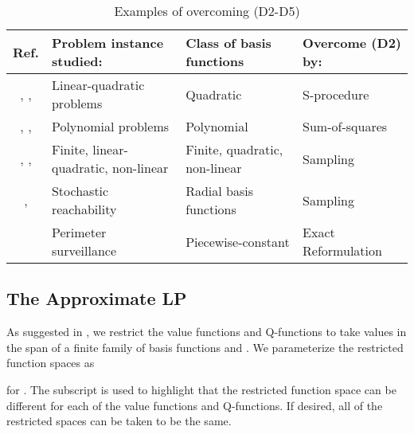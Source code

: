 \documentclass[journal]{IEEEtran}
\newcommand{\textQ}{Q}
\begin{document}
\begin{table*} [t] \centering
\caption{Examples of overcoming (D2-D5)}
\vspace{-0.1cm}
\begin{tabular}{|c|l|l|l|}
		\hline
		Ref.		& Problem instance studied:   & Class of basis functions  & Overcome (D2) by:
		\\
		\hline \cite{boyd_iteratedBellman}, \cite{boyd_2011_minmax}, \cite{boyd_2013_iteratedApproxValueFunctions}
		&
		Linear-quadratic problems
		&
		Quadratic
		&
		S-procedure
		\\
		\hline
		\cite{lasserre_2009_soc_via_occupation_measures}, \cite{boyd_iteratedBellman}, \cite{summers_ADPwithSOS}
		&
		Polynomial problems
		&
		Polynomial
		&
		Sum-of-squares
		\\ 
		\hline
		\cite{vanroy_sampDP}, \cite{boyd_2012_quadraticADP}, \cite{sutter_2014_ADPsamp}
		&
		Finite, linear-quadratic, non-linear
		&
		Finite, quadratic, non-linear
		&
		Sampling
		\\
		\hline
		\cite{nikos_2013_ADPforReachability}, \cite{nikos_2015_ADPforReachability_arXiv}
		&
		Stochastic reachability
		&
		Radial basis functions
		&
		Sampling
		\\
		\hline
		\cite{swaroop_2010_pwcValueFunc}
		\cite{swaroop_2011_pwcValueFunc_forPerimeterPatrol}
		&
		Perimeter surveillance
		&
		Piecewise-constant
		&
		Exact Reformulation
		\\
		\hline
		
	\end{tabular}
\vspace{-0.2cm}
\label{tab:D2_D5_reformuation_summary}
\end{table*}









\subsection{The Approximate LP} \label{sec:adp_approxlp}

As suggested in \cite{schweitzer_originalMDP}, we restrict the value functions and \textQ-functions to take values in the span of a finite family of basis functions  and . We parameterize the restricted function spaces as

for . The subscript  is used to highlight that the restricted function space can be different for each of the value functions and \textQ-functions. If desired, all of the restricted spaces can be taken to be the same.
\end{document}
